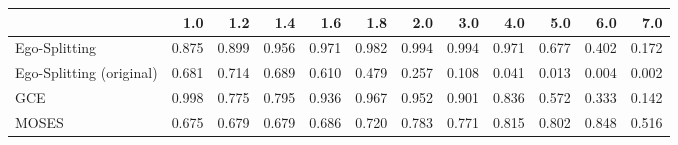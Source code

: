 \begin{tabular}{lrrrrrrrrrrr}
\toprule
{} &   1.0 &   1.2 &   1.4 &   1.6 &   1.8 &   2.0 &   3.0 &   4.0 &   5.0 &   6.0 &   7.0 \\
\midrule
Ego-Splitting            & 0.875 & 0.899 & 0.956 & 0.971 & 0.982 & 0.994 & 0.994 & 0.971 & 0.677 & 0.402 & 0.172 \\
Ego-Splitting (original) & 0.681 & 0.714 & 0.689 & 0.610 & 0.479 & 0.257 & 0.108 & 0.041 & 0.013 & 0.004 & 0.002 \\
GCE                      & 0.998 & 0.775 & 0.795 & 0.936 & 0.967 & 0.952 & 0.901 & 0.836 & 0.572 & 0.333 & 0.142 \\
MOSES                    & 0.675 & 0.679 & 0.679 & 0.686 & 0.720 & 0.783 & 0.771 & 0.815 & 0.802 & 0.848 & 0.516 \\
\bottomrule
\end{tabular}

